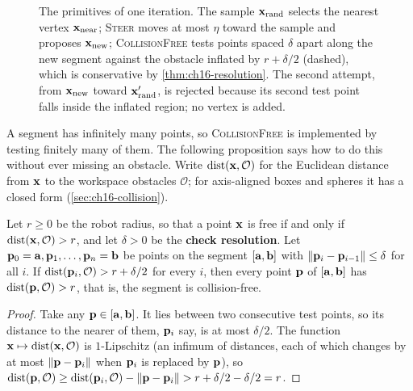 \begin{figure}[tb]
  \centering
  \caption{The primitives of one iteration. The sample $\mathbf{x}_{\mathrm{rand}}$
  selects the nearest vertex $\mathbf{x}_{\mathrm{near}}$; \textsc{Steer} moves at most
  $\eta$ toward the sample and proposes $\mathbf{x}_{\mathrm{new}}$;
  \textsc{CollisionFree} tests points spaced $\delta$ apart along the new
  segment against the obstacle inflated by $r+\delta/2$ (dashed), which is
  conservative by \cref{thm:ch16-resolution}. The second attempt, from
  $\mathbf{x}_{\mathrm{new}}$ toward $\mathbf{x}'_{\mathrm{rand}}$, is rejected because its
  second test point falls inside the inflated region; no vertex is added.}
  \label{fig:ch16-primitives}
\end{figure}

A segment has infinitely many points, so \textsc{CollisionFree} is
implemented by testing finitely many of them. The following proposition says
how to do this without ever missing an obstacle. Write $\operatorname{dist}(\mathbf{x},\mathcal{O})$
for the Euclidean distance from $\mathbf{x}$ to the workspace obstacles $\mathcal{O}$;
for axis-aligned boxes and spheres it has a closed form
(\cref{sec:ch16-collision}).

\begin{proposition}
\label{thm:ch16-resolution}
Let $r\ge0$ be the robot radius, so that a point $\mathbf{x}$ is free if and only if
$\operatorname{dist}(\mathbf{x},\mathcal{O})>r$, and let $\delta>0$ be the \textbf{check
resolution}.
Let $\mathbf{p}_0=\mathbf{a},\mathbf{p}_1,\dots,\mathbf{p}_n=\mathbf{b}$ be points on the segment $[\mathbf{a},\mathbf{b}]$ with
$\left\lVert \mathbf{p}_{i}-\mathbf{p}_{i-1} \right\rVert\le\delta$ for all $i$. If $\operatorname{dist}(\mathbf{p}_i,\mathcal{O})>r+\delta/2$
for every $i$, then every point $\mathbf{p}$ of $[\mathbf{a},\mathbf{b}]$ has $\operatorname{dist}(\mathbf{p},\mathcal{O})>r$, that is,
the segment is collision-free.
\end{proposition}
\begin{proof}
Take any $\mathbf{p}\in[\mathbf{a},\mathbf{b}]$. It lies between two consecutive test points, so its
distance to the nearer of them, $\mathbf{p}_i$ say, is at most $\delta/2$. The function
$\mathbf{x}\mapsto\operatorname{dist}(\mathbf{x},\mathcal{O})$ is $1$-Lipschitz (an infimum of distances,
each of which changes by at most $\left\lVert \mathbf{p}-\mathbf{p}_i \right\rVert$ when $\mathbf{p}_i$ is replaced by
$\mathbf{p}$), so
$\operatorname{dist}(\mathbf{p},\mathcal{O})\ge\operatorname{dist}(\mathbf{p}_i,\mathcal{O})-\left\lVert \mathbf{p}-\mathbf{p}_i \right\rVert>r+\delta/2-\delta/2=r$.
\qedhere
\end{proof}

